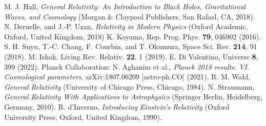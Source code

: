 \documentclass[11pt]{article}
\theoremstyle{break}
\theoremstyle{break}
\begin{document}
\begin{thebibliography}{10}
M. J. Hall, \textit{General Relativity: An Introduction to Black Holes, Gravitational Waves, and Cosmology }(Morgan \& Claypool Publishers, San Rafael, CA, 2018).  
N. Deruelle, and J.-P. Uzan, \textit{Relativity in Modern Physics} (Oxford Academic, Oxford, United Kingdom, 2018)
K. Koyama, Rep. Prog. Phys. \textbf{79}, 046902 (2016).
S. H. Suyu, T.-C. Chang, F. Courbin, and T. Okumura, Space Sci. Rev. \textbf{214}, 91 (2018).
M. Ishak, Living Rev. Relativ. \textbf{22}, 1 (2019).
E. Di Valentino,  Universe \textbf{8}, 399 (2022).
Planck Collaboration: N. Aghanim et al., \textit{Planck 2018 results. VI. Cosmological parameters}, 	arXiv:1807.06209 [astro-ph.CO] (2021). 
R. M. Wald, \textit{General Relativity} (University of Chicago Press, Chicago, 1984). 
N. Straumann, \textit{General Relativity With Applications to Astrophysics} (Springer Berlin, Heidelberg, Germany, 2010).
R. d'Inverno, \textit{Introducing Einstein's Relativity} (Oxford University Press, Oxford, United Kingdom, 1990).
\end{thebibliography}
\end{document}
